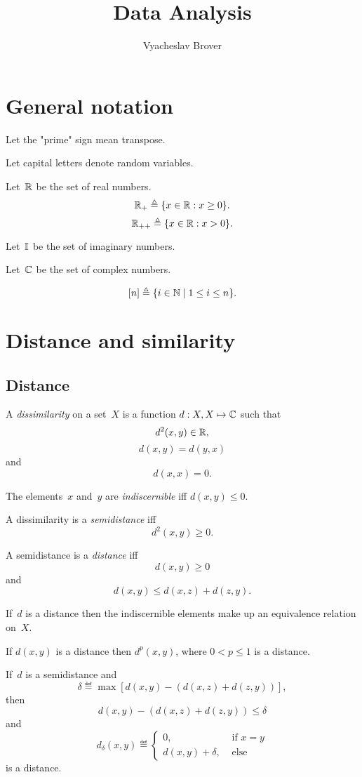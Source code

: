 \documentclass[10pt,a4paper]{article}
\title{Data Analysis}
\author{Vyacheslav Brover}
\theoremstyle{plain} \newtheorem{Lem}{Lemma}
\begin{document}
\maketitle

\tableofcontents


\section{General notation}
Let the "prime" sign mean transpose.

Let capital letters denote random variables.

Let~$\mathbb R$ be the set of real numbers.
$$ \mathbb R_+ \triangleq \{x \in \mathbb R: x \ge 0 \}. $$
$$ \mathbb R_{++} \triangleq \{x \in \mathbb R: x > 0 \}. $$

Let~$\mathbb I$ be the set of imaginary numbers.

Let~$\mathbb C$ be the set of complex numbers.

$$ [n] \triangleq \{i \in \mathbb N \mid 1 \le i \le n\}. $$



\section{Distance and similarity}

\subsection{Distance}
A {\em dissimilarity} on a set~$X$ is a function $d:X,X \mapsto \mathbb C$ such that
$$ d^2(x,y) \in \mathbb R, $$
$$ d(x,y) = d(y,x) $$
and
$$ d(x,x) = 0. $$

The elements~$x$ and~$y$ are {\em indiscernible} iff $d(x,y) \le 0$.

A dissimilarity is a {\em semidistance} iff
\begin{equation} \tag{semidistance non-negativity}
  d^2(x,y) \ge 0.
\end{equation}

A semidistance is a {\em distance} iff
$$ d(x,y) \ge 0 $$
and
\begin{equation} \tag{triangle inequality}
  d(x,y) \le d(x,z) + d(z,y).
\end{equation}

If~$d$ is a distance then the indiscernible elements make up an equivalence relation on~$X$.

If $d(x,y)$ is a distance then $d^p(x,y)$, where $0 < p \le 1$ is a distance.

If~$d$ is a semidistance and
$$ \delta \eqdef \max [d(x,y) - (d(x,z) + d(z,y))], $$
then
$$ d(x,y) - (d(x,z) + d(z,y)) \le \delta $$
and
\begin{equation*}
  d_\delta(x,y) \eqdef
    \begin{cases}
      0, &\text{ if } x = y\\
      d(x,y) + \delta,   &\text{ else}
    \end{cases}
\end{equation*}
is a distance.
\end{document}
